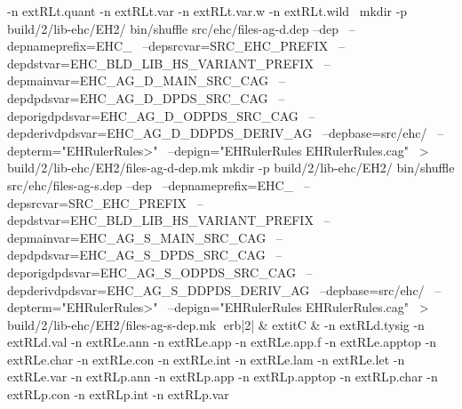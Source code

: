 -n 	extRL{t.quant}\hspace{.5em} 
-n 	extRL{t.var}\hspace{.5em} 
-n 	extRL{t.var.w}\hspace{.5em} 
-n 	extRL{t.wild}\hspace{.5em} 
\
mkdir -p build/2/lib-ehc/EH2/
bin/shuffle src/ehc/files-ag-d.dep --dep \
	  --depnameprefix=EHC_ \
	  --depsrcvar=SRC_EHC_PREFIX \
	  --depdstvar=EHC_BLD_LIB_HS_VARIANT_PREFIX \
	  --depmainvar=EHC_AG_D_MAIN_SRC_CAG \
	  --depdpdsvar=EHC_AG_D_DPDS_SRC_CAG \
	  --deporigdpdsvar=EHC_AG_D_ODPDS_SRC_CAG \
	  --depderivdpdsvar=EHC_AG_D_DDPDS_DERIV_AG \
	  --depbase=src/ehc/ \
	  --depterm="EHRulerRules>" \
	  --depign="EHRulerRules EHRulerRules.cag" \
	    > build/2/lib-ehc/EH2/files-ag-d-dep.mk
mkdir -p build/2/lib-ehc/EH2/
bin/shuffle src/ehc/files-ag-s.dep --dep \
	  --depnameprefix=EHC_ \
	  --depsrcvar=SRC_EHC_PREFIX \
	  --depdstvar=EHC_BLD_LIB_HS_VARIANT_PREFIX \
	  --depmainvar=EHC_AG_S_MAIN_SRC_CAG \
	  --depdpdsvar=EHC_AG_S_DPDS_SRC_CAG \
	  --deporigdpdsvar=EHC_AG_S_ODPDS_SRC_CAG \
	  --depderivdpdsvar=EHC_AG_S_DDPDS_DERIV_AG \
	  --depbase=src/ehc/ \
	  --depterm="EHRulerRules>" \
	  --depign="EHRulerRules EHRulerRules.cag" \
	    > build/2/lib-ehc/EH2/files-ag-s-dep.mk
erb|2| & 	extit{C} & 
-n 	extRL{d.tysig}\hspace{.5em} 
-n 	extRL{d.val}\hspace{.5em} 
-n 	extRL{e.ann}\hspace{.5em} 
-n 	extRL{e.app}\hspace{.5em} 
-n 	extRL{e.app.f}\hspace{.5em} 
-n 	extRL{e.apptop}\hspace{.5em} 
-n 	extRL{e.char}\hspace{.5em} 
-n 	extRL{e.con}\hspace{.5em} 
-n 	extRL{e.int}\hspace{.5em} 
-n 	extRL{e.lam}\hspace{.5em} 
-n 	extRL{e.let}\hspace{.5em} 
-n 	extRL{e.var}\hspace{.5em} 
-n 	extRL{p.ann}\hspace{.5em} 
-n 	extRL{p.app}\hspace{.5em} 
-n 	extRL{p.apptop}\hspace{.5em} 
-n 	extRL{p.char}\hspace{.5em} 
-n 	extRL{p.con}\hspace{.5em} 
-n 	extRL{p.int}\hspace{.5em} 
-n 	extRL{p.var}\hspace{.5em} 
